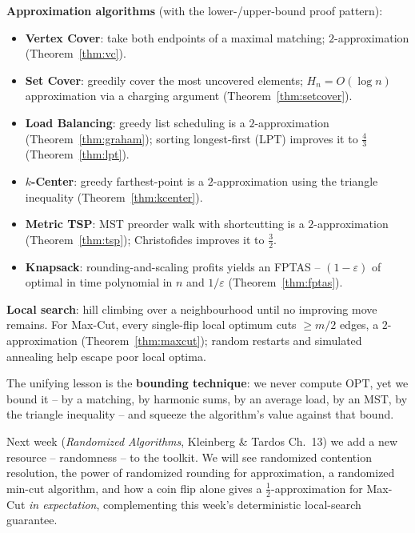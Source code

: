 \documentclass[11pt]{article}
\begin{document}
\textbf{Approximation algorithms} (with the lower-/upper-bound proof pattern):
\begin{itemize}
    \item \textbf{Vertex Cover}: take both endpoints of a maximal matching;
    $2$-approximation (Theorem~\ref{thm:vc}).
    \item \textbf{Set Cover}: greedily cover the most uncovered elements; $H_n = O(\log
    n)$ approximation via a charging argument (Theorem~\ref{thm:setcover}).
    \item \textbf{Load Balancing}: greedy list scheduling is a $2$-approximation
    (Theorem~\ref{thm:graham}); sorting longest-first (LPT) improves it to $\tfrac{4}{3}$
    (Theorem~\ref{thm:lpt}).
    \item \textbf{$k$-Center}: greedy farthest-point is a $2$-approximation using the
    triangle inequality (Theorem~\ref{thm:kcenter}).
    \item \textbf{Metric TSP}: MST preorder walk with shortcutting is a $2$-approximation
    (Theorem~\ref{thm:tsp}); Christofides improves it to $\tfrac32$.
    \item \textbf{Knapsack}: rounding-and-scaling profits yields an FPTAS --
    $(1-\varepsilon)$ of optimal in time polynomial in $n$ and $1/\varepsilon$
    (Theorem~\ref{thm:fptas}).
\end{itemize}

\textbf{Local search}: hill climbing over a neighbourhood until no improving move remains.
For Max-Cut, every single-flip local optimum cuts $\ge m/2$ edges, a $2$-approximation
(Theorem~\ref{thm:maxcut}); random restarts and simulated annealing help escape poor local
optima.

The unifying lesson is the \textbf{bounding technique}: we never compute $\mathrm{OPT}$, yet
we bound it -- by a matching, by harmonic sums, by an average load, by an MST, by the
triangle inequality -- and squeeze the algorithm's value against that bound.

Next week (\emph{Randomized Algorithms}, Kleinberg \& Tardos Ch.\ 13) we add a new
resource -- randomness -- to the toolkit. We will see randomized contention resolution,
the power of randomized rounding for approximation, a randomized min-cut algorithm, and
how a coin flip alone gives a $\tfrac12$-approximation for Max-Cut \emph{in expectation},
complementing this week's deterministic local-search guarantee.
\end{document}
